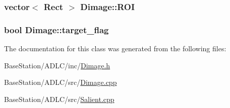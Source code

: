 \hypertarget{classDimage_a84e08d484952cbe4f1375826924f1ee9}{
\subsubsection[{R\-O\-I}]{\setlength{\rightskip}{0pt plus 5cm}vector$<$ Rect $>$ Dimage\-::\-R\-O\-I}}\label{classDimage_a84e08d484952cbe4f1375826924f1ee9}
\hypertarget{classDimage_aa0e2203121319a2f3d5461a8ec161694}{
\subsubsection[{target\-\_\-flag}]{\setlength{\rightskip}{0pt plus 5cm}bool Dimage\-::target\-\_\-flag}}\label{classDimage_aa0e2203121319a2f3d5461a8ec161694}


The documentation for this class was generated from the following files\-:\begin{DoxyCompactItemize}
\item 
Base\-Station/\-A\-D\-L\-C/inc/\hyperlink{BaseStation_2ADLC_2inc_2Dimage_8h}{Dimage.\-h}\item 
Base\-Station/\-A\-D\-L\-C/src/\hyperlink{Dimage_8cpp}{Dimage.\-cpp}\item 
Base\-Station/\-A\-D\-L\-C/src/\hyperlink{Salient_8cpp}{Salient.\-cpp}\end{DoxyCompactItemize}
